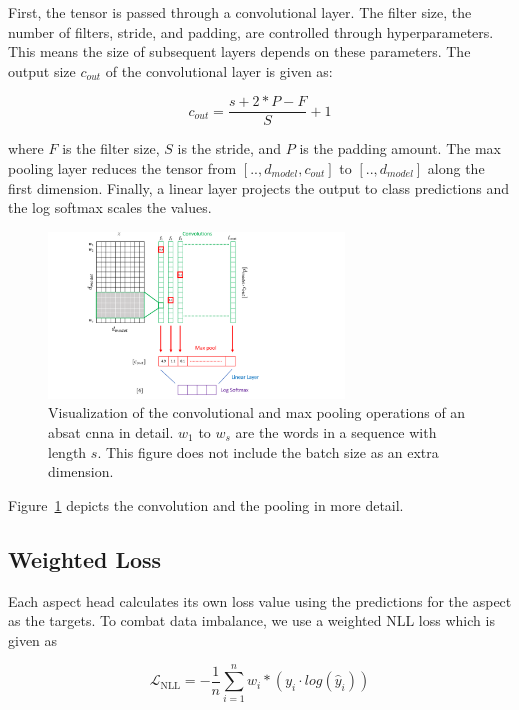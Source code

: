 First, the tensor is passed through a convolutional layer. The filter size, the number of filters, stride, and padding, are controlled through hyperparameters. This means the size of subsequent layers depends on these parameters. The output size $c_{out}$ of the convolutional layer is given as:

\begin{equation}
    c_{out} = \frac{s+2*P-F}{S} + 1
\end{equation}

where $F$ is the filter size, $S$ is the stride, and $P$ is the padding amount. The max pooling layer reduces the tensor from $[.., d_{model}, c_{out}]$ to $[.., d_{model}]$ along the first dimension. Finally, a linear layer projects the output to class predictions and the log softmax scales the values.
\medskip

\begin{figure}[htp]
    \centering
    \includegraphics[width=0.7\textwidth]{figures/04_method/04_ch2}
    \caption{Visualization of the convolutional and max pooling operations of an \gls{absat} \gls{cnna} in detail. $w_1$ to $w_s$ are the words in a sequence with length $s$. This figure does not include the batch size as an extra dimension.}
    \label{fig:04_ch2}
\end{figure}

Figure~\ref{fig:04_ch2} depicts the convolution and the pooling in more detail.

\subsection{Weighted Loss}

Each aspect head calculates its own loss value using the predictions for the aspect as the targets. To combat data imbalance, we use a weighted NLL loss which is given as

\begin{equation}
\mathcal{L}_\text{NLL}=-\frac{1}{n}\sum_{i=1}^{n} w_i * (y_i \cdot log(\hat{y}_i))
\label{eq:04_nll}
\end{equation}

